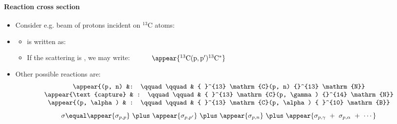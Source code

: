 \begin{frame}
\frametitle{\texorpdfstring{\culine[\sectiontitleulinecolor]{\sectiontitle}}{\sectiontitle} }
\framesubtitle{Reaction cross section}

% 
\begin{itemize}
	\item Consider e.g. beam of protons incident on ${ }^{13} \mathrm{C}$ atoms:
	\item[] \begin{itemize}[itemsep=3mm]
	 \item {} is written as:  

\item If the scattering is , we may write:
$
\hspace{1cm} \appear{{ }^{13} \mathrm{C} ( \mathrm{p}, \mathrm{p}^{\prime} ) {}^{13} \mathrm{C}^{*}}
$\\
\end{itemize}



\item Other possible reactions are: 
$$
 \begin{array}{ccc}
 \appear{(p, n) &: \qquad \qquad& { }^{13} \mathrm{C}(p, n) {}^{13} \mathrm{N}} \\ 
 \appear{\text {capture} &  : \qquad\qquad & { }^{13} \mathrm{C}(p, \gamma) {}^{14} \mathrm{N}} \\ 
 \appear{(p, \alpha) & : \qquad \qquad& { }^{13} \mathrm{C}(p, \alpha) { }^{10} \mathrm{B}}\end{array}
$$
 
\[
\sigma  \equal \appear{\sigma_{p, p}} ~\plus~ \appear{\sigma_{p, p^{\prime}}} ~\plus~ \appear{\sigma_{p, n}}  ~\plus~ \appear{\sigma_{p, \gamma} ~+~ \sigma_{p, \alpha} ~+~ \cdots}
\]
\end{itemize}


\endofslide 
\end{frame}


